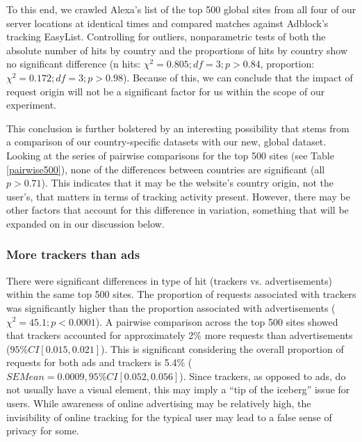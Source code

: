 \documentclass[conference]{IEEEtran}
\newcommand{\todo}[1]{}
\renewcommand{\todo}[1]{{\color{red} TODO: {#1}}}
\begin{document}

To this end, we crawled Alexa's list of the top 500 global sites from all four of our server locations at identical times and compared matches against Adblock's tracking EasyList. Controlling for outliers, nonparametric tests of both the absolute number of hits by country and the proportions of hits by country show no significant difference (n hits: $\chi^{2}=0.805; df=3; p>0.84$, proportion: $\chi^{2}=0.172; df=3; p>0.98$). Because of this, we can conclude that the impact of request origin will not be a significant factor for us within the scope of our experiment.  

This conclusion is further bolstered by an interesting possibility that stems from a comparison of our country-specific datasets with our new, global dataset. Looking at the series of pairwise comparisons for the top 500 sites (see Table \ref{pairwise500}), none of the differences between countries are significant (all $p>0.71$). This indicates that it may be the website's country origin, not the user's, that matters in terms of tracking activity present. However, there may be other factors that account for this difference in variation, something that will be expanded on in our discussion below. 


\subsubsection{More trackers than ads}
There were significant differences in type of hit (trackers vs. advertisements) within the same top 500 sites. The proportion of requests associated with trackers was significantly higher than the proportion associated with advertisements ($\chi^{2}=45.1; p<0.0001$). A pairwise comparison across the top 500 sites showed that trackers accounted for approximately 2\% more requests than advertisements ($95\% CI [0.015, 0.021]$). This is significant considering the overall proportion of requests for both ads and trackers is 5.4\% ($SEMean = 0.0009, 95\% CI [0.052, 0.056]$). Since trackers, as opposed to ads, do not usually have a visual element, this may imply a ``tip of the iceberg'' issue for users. While awareness of online advertising may be relatively high, the invisibility of online tracking for the typical user may lead to a false sense of privacy for some. 
\end{document}
